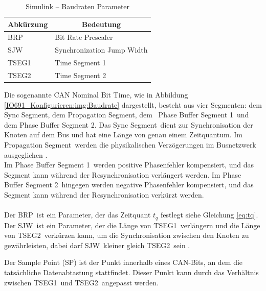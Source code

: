 \pagebreak[1]
\begin{table}[!ht]
	\centering
	\caption{Simulink – Baudraten Parameter }
	\label{IO691_Konfigurieren:tab:Baudraten}
	\begin{tabular}{ll}
		\hline
		\multicolumn{1}{c}{\textbf{Abkürzung}} & \multicolumn{1}{c}{\textbf{Bedeutung}} \\ \hline
		\multicolumn{1}{l|}{BRP}               & Bit Rate Prescaler                     \\
		\multicolumn{1}{l|}{SJW}               & Synchronization Jump Width             \\
		\multicolumn{1}{l|}{TSEG1}             & Time Segment 1                         \\
		\multicolumn{1}{l|}{TSEG2}             & Time Segment 2                         \\ \hline
	\end{tabular}
\end{table}
\pagebreak[1]



Die sogenannte \frqq CAN Nominal Bit Time\flqq, wie in Abbildung \ref{IO691_Konfigurieren:img:Baudrate} dargestellt, besteht aus vier Segmenten: dem \frqq Sync Segment\flqq, dem \frqq Propagation Segment\flqq, dem \frqq\ Phase Buffer Segment 1\flqq\ und dem \frqq Phase Buffer Segment 2\flqq.
Das \frqq Sync Segment\flqq\ dient zur Synchronisation der Knoten auf dem Bus und hat eine Länge von genau einem Zeitquantum.
Im \frqq Propagation Segment\flqq\ werden die physikalischen Verzögerungen im Busnetzwerk ausgeglichen \cite[1]{microchip:CANModule}.\\
Im \frqq Phase Buffer Segment 1\flqq\ werden positive Phasenfehler kompensiert, und das Segment kann während der Resynchronisation verlängert werden. Im \frqq Phase Buffer Segment 2\flqq\ hingegen werden negative Phasenfehler kompensiert, und das Segment kann während der Resynchronisation verkürzt werden.\\ \ \\



Der \frqq BRP\flqq\ ist ein Parameter, der das Zeitquant $t_q$ festlegt siehe Gleichung \ref{eq:tq}.
Der \frqq SJW\flqq\ ist ein Parameter, der die Länge von \frqq TSEG1\flqq\ verlängern und die Länge von \frqq TSEG2\flqq\ verkürzen kann, um die Synchronisation zwischen den Knoten zu gewährleisten, dabei darf \frqq SJW\flqq\ kleiner gleich \frqq TSEG2\flqq\ sein \cite{speedgoat:IO691:CAN_Message}.

Der Sample Point (SP) ist der Punkt innerhalb eines CAN-Bits, an dem die tatsächliche Datenabtastung stattfindet. Dieser Punkt kann durch das Verhältnis zwischen \frqq TSEG1\flqq\ und \frqq TSEG2\flqq\ angepasst werden.

